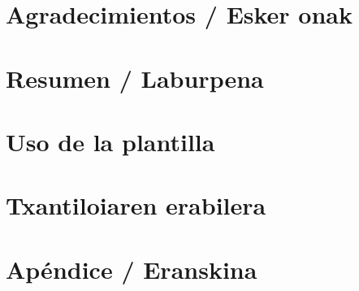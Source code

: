 \documentclass[a4paper, 11pt]{memoir}
\title{\titulo}
\author{\alumno}
\date{\fecha}
\begin{document}
	
\frontmatter


\cleardoublepage


\chapter*{Agradecimientos / Esker onak}

\cleardoublepage


\chapter*{Resumen / Laburpena}

\cleardoublepage


\tableofcontents
\clearpage
\listoffigures
\clearpage
\listoftables
\clearpage
{\let\newpage\relax\listofalgorithms} %
\clearpage
{}
{}
{\let\newpage\relax\printglossary[title=\glossarylabel]}
\clearpage
{}
{}
{\let\newpage\relax\printglossary[type=\acronymtype,title=\acronymslabel]}
\clearpage



\cleardoublepage
\mainmatter
\pagestyle{ruled}

\chapter{Uso de la plantilla} \label{ch:plantilla}

\cleardoublepage

\chapter{Txantiloiaren erabilera} \label{ch:txantiloia}

\cleardoublepage


\backmatter
\appendix

\chapter{Apéndice / Eranskina} \label{ch:apendice}





\end{document}
